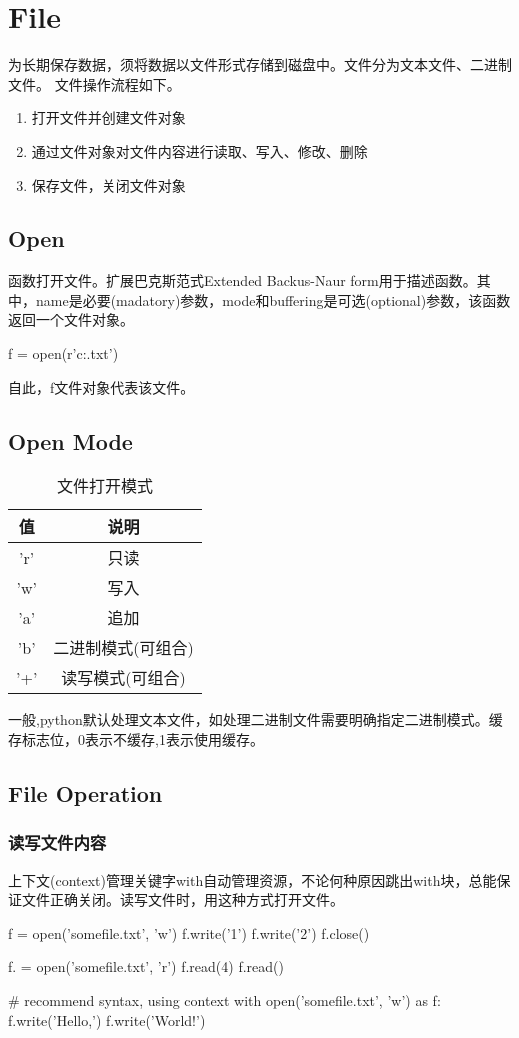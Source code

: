 \section{File}
为长期保存数据，须将数据以文件形式存储到磁盘中。文件分为文本文件、二进制文件。
文件操作流程如下。
\begin{enumerate}
\item 打开文件并创建文件对象
\item 通过文件对象对文件内容进行读取、写入、修改、删除
\item 保存文件，关闭文件对象
\end{enumerate}
\subsection{Open}
函数打开文件。扩展巴克斯范式Extended Backus-Naur form用于描述函数。其中，name是必要(madatory)参数，mode和buffering是可选(optional)参数，该函数返回一个文件对象。

\begin{python}
f = open(r'c:\text\somefile.txt')
\end{python}
自此，f文件对象代表该文件。

\subsection{Open Mode}
\begin{table}
\centering
\begin{tabular}{cc}
  \toprule
  值  & 说明 \\
  \midrule
  'r' & 只读 \\
  'w' & 写入 \\
  'a' & 追加 \\
  'b' & 二进制模式(可组合) \\
  '+' & 读写模式(可组合) \\
  \bottomrule
\end{tabular}
\caption{文件打开模式}
\end{table}
一般,python默认处理文本文件，如处理二进制文件需要明确指定二进制模式。缓存标志位，0表示不缓存,1表示使用缓存。
\subsection{File Operation}
\subsubsection{读写文件内容}
上下文(context)管理关键字with自动管理资源，不论何种原因跳出with块，总能保证文件正确关闭。读写文件时，用这种方式打开文件。
\begin{python}
f = open('somefile.txt', 'w')
f.write('1')
f.write('2')
f.close()

f. = open('somefile.txt', 'r')
f.read(4)
f.read()

# recommend syntax, using context
with open('somefile.txt', 'w') as f:
    f.write('Hello,')
    f.write('World!')
    
\end{python}

